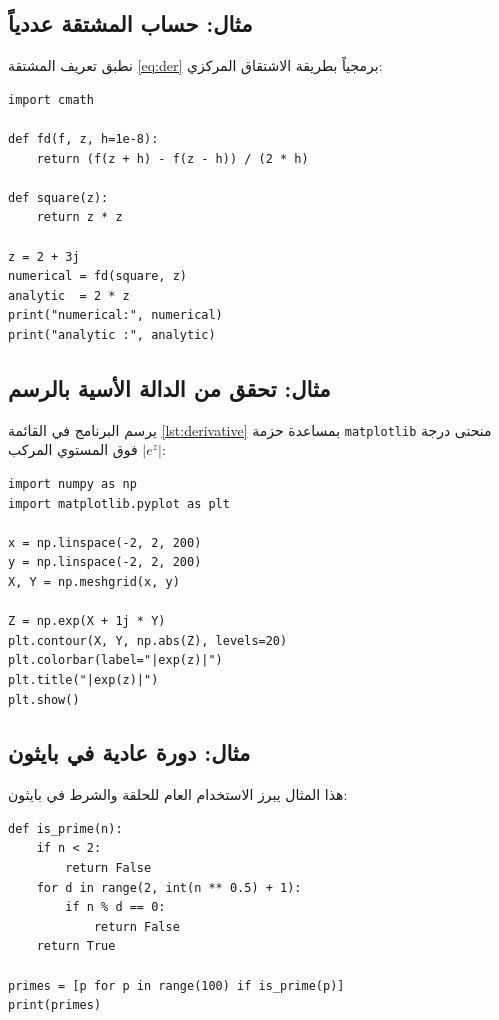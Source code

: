 \subsection{مثال: حساب المشتقة عددياً}

نطبق تعريف المشتقة \eqref{eq:der} برمجياً بطريقة الاشتقاق المركزي:
\begin{otherlanguage}{english}
\begin{lstlisting}[label={lst:derivative}, caption={Numerical derivative of a complex function}]
import cmath

def fd(f, z, h=1e-8):
    return (f(z + h) - f(z - h)) / (2 * h)

def square(z):
    return z * z

z = 2 + 3j
numerical = fd(square, z)
analytic  = 2 * z
print("numerical:", numerical)
print("analytic :", analytic)
\end{lstlisting}
\end{otherlanguage}

\subsection{مثال: تحقق من الدالة الأسية بالرسم}

يرسم البرنامج في القائمة \ref{lst:derivative} بمساعدة حزمة \texttt{matplotlib} منحنى درجة $|e^z|$ فوق المستوي المركب:
\begin{otherlanguage}{english}
\begin{lstlisting}[caption={Plot of the modulus of exp(z) using matplotlib}]
import numpy as np
import matplotlib.pyplot as plt

x = np.linspace(-2, 2, 200)
y = np.linspace(-2, 2, 200)
X, Y = np.meshgrid(x, y)

Z = np.exp(X + 1j * Y)
plt.contour(X, Y, np.abs(Z), levels=20)
plt.colorbar(label="|exp(z)|")
plt.title("|exp(z)|")
plt.show()
\end{lstlisting}
\end{otherlanguage}

\subsection{مثال: دورة عادية في بايثون}

هذا المثال يبرز الاستخدام العام للحلقة والشرط في بايثون:
\begin{otherlanguage}{english}
\begin{lstlisting}[caption={Finding prime numbers up to 100}]
def is_prime(n):
    if n < 2:
        return False
    for d in range(2, int(n ** 0.5) + 1):
        if n % d == 0:
            return False
    return True

primes = [p for p in range(100) if is_prime(p)]
print(primes)
\end{lstlisting}
\end{otherlanguage}
